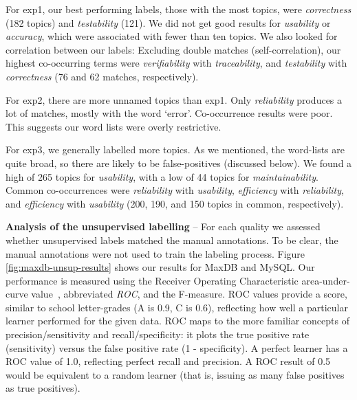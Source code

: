 \documentclass[]{sig-alternate}
\begin{document}
For \textsf{exp1}, our best performing labels, those with the most topics, were \emph{correctness} (182 topics) and \emph{testability} (121). 
We did not get good results for \emph{usability} or \emph{accuracy}, which were associated with fewer than ten topics. 
We also looked for correlation between our labels: Excluding double matches (self-correlation), our highest co-occurring terms were \emph{verifiability} with \emph{traceability}, and \emph{testability} with \emph{correctness} (76 and 62 matches, respectively).

For \textsf{exp2}, there are more unnamed topics than \textsf{exp1}. 
Only \emph{reliability} produces a lot of matches, mostly with the word `error'. 
Co-occurrence results were poor. This suggests our word lists were overly restrictive.

For \textsf{exp3}, we generally labelled more topics. 
As we mentioned, the word-lists are quite broad, so there are likely to be false-positives (discussed below). 
We found a high of 265 topics for \emph{usability}, with a low of 44 topics for \emph{maintainability}. 
Common co-occurrences were \emph{reliability} with \emph{usability}, \emph{efficiency} with \emph{reliability}, and \emph{efficiency} with \emph{usability} (200, 190, and 150 topics in common, respectively). 



\noindent \textbf{Analysis of the unsupervised labelling} -- %
For each quality we assessed whether unsupervised labels matched the manual annotations. To be clear, the manual annotations were not used to train the labeling process.
Figure \ref{fig:maxdb-unsup-results} shows our results for MaxDB and MySQL. 
Our performance is measured using the Receiver Operating
Characteristic area-under-curve value~\cite{Fawcett2006861},
abbreviated \emph{ROC}, and the F-measure. 
ROC values provide a score, similar to school letter-grades (A is 0.9, C is 0.6), reflecting how well a particular learner performed for the given data. 
ROC maps to the more familiar concepts of precision/sensitivity and recall/specificity: it plots the true positive rate (sensitivity) versus the false positive rate (1 - specificity). 
A perfect learner has a ROC value of 1.0, reflecting perfect recall and precision. 
A ROC result of 0.5 would be equivalent to a random learner (that is, issuing as many false positives as true positives). 
\end{document}
